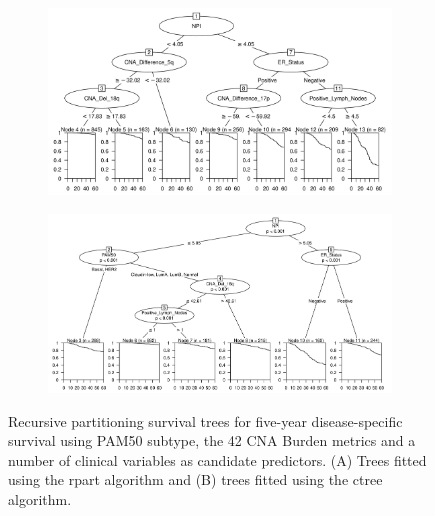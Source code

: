 \begin{figure}[!h]
\centering

\vspace{1cm}

\begin{subfigure}{\textwidth}
\subcaption{}
\includegraphics[width=1\textwidth]{../figures/Chapter_3/Clin_PA_PartyKit_Survival_Burden_FiveYearDSS_PAM50.png}
\end{subfigure}

\vspace{2cm}

\begin{subfigure}{\textwidth}
\subcaption{}
\includegraphics[width=1\textwidth]{../figures/Chapter_3/Clin_PA_Ctree_Survival_Burden_FiveYearDSS_PAM50.png}
\end{subfigure}

\vspace{1cm}

\caption[Recursive partitioning survival trees for five-year disease-specific survival using PAM50 subtype, the 42 CNA Burden metrics and a number of clinical variables as candidate predictors.]{Recursive partitioning survival trees for five-year disease-specific survival using PAM50 subtype, the 42 CNA Burden metrics and a number of clinical variables as candidate predictors. (A) Trees fitted using the rpart algorithm and (B) trees fitted using the ctree algorithm.}
\label{fig:PA_PAM50_CNA_Burden_FiveYearDSS_Clin}
\end{figure}

